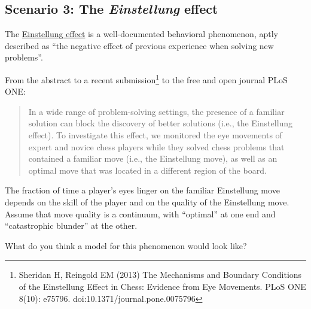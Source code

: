 \documentclass[12pt]{exam}
\theoremstyle{definition}
\begin{document}

\subsection{Scenario 3: The \emph{Einstellung} effect}

The \href{http://en.wikipedia.org/wiki/Einstellung_effect}{Einstellung
effect} is a well-documented behavioral phenomenon, aptly described as
``the negative effect of previous experience when solving new
problems''.

From the abstract to a recent
submission\footnote{Sheridan H, Reingold EM (2013) The Mechanisms and Boundary Conditions of the Einstellung Effect in Chess: Evidence from Eye Movements. PLoS ONE 8(10): e75796. doi:10.1371/journal.pone.0075796}
to the free and open journal PLoS ONE:

\begin{quote}
In a wide range of problem-solving settings, the presence of a familiar
solution can block the discovery of better solutions (i.e., the
Einstellung effect). To investigate this effect, we monitored the eye
movements of expert and novice chess players while they solved chess
problems that contained a familiar move (i.e., the Einstellung move), as
well as an optimal move that was located in a different region of the
board.
\end{quote}

The fraction of time a player's eyes linger on the familiar Einstellung
move depends on the skill of the player and on the quality of the
Einstellung move. Assume that move quality is a continuum, with
``optimal'' at one end and ``catastrophic blunder'' at the other.

What do you think a model for this phenomenon would look like?

\end{document}
